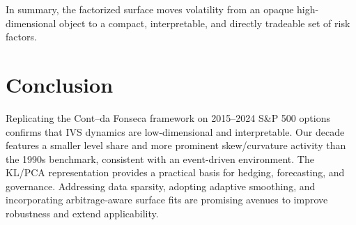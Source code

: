 \documentclass[a4paper,12pt]{report}
\begin{document}
In summary, the factorized surface moves volatility from an opaque high-dimensional object to a compact, interpretable, and directly tradeable set of risk factors.



\chapter{Conclusion}
 Replicating the Cont–da Fonseca framework on 2015–2024 S\&P 500 options confirms that IVS dynamics are low‑dimensional and interpretable. Our decade features a smaller level share and more prominent skew/curvature activity than the 1990s benchmark, consistent with an event‑driven environment. The KL/PCA representation provides a practical basis for hedging, forecasting, and governance. Addressing data sparsity, adopting adaptive smoothing, and incorporating arbitrage‑aware surface fits are promising avenues to improve robustness and extend applicability.
\end{document}
